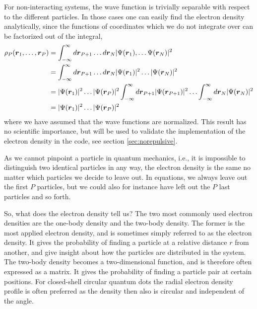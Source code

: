 For non-interacting systems, the wave function is trivially separable with respect to the different particles. In those cases one can easily find the electron density analytically, since the functions of coordinates which we do not integrate over can be factorized out of the integral,
\begin{equation}
\begin{aligned}
\rho_P(\boldsymbol{{r}}_1,\hdots,\boldsymbol{{r}}_P)&=\int_{-\infty}^{\infty}d\boldsymbol{{r}}_{P+1}\hdots d\boldsymbol{{r}}_N |\Psi(\boldsymbol{{r}}_1),\hdots \Psi(\boldsymbol{{r}}_N)|^2\\
&=\int_{-\infty}^{\infty}d\boldsymbol{{r}}_{P+1}\hdots d\boldsymbol{{r}}_N |\Psi(\boldsymbol{{r}}_1)|^2\hdots |\Psi(\boldsymbol{{r}}_N)|^2\\
&=|\Psi(\boldsymbol{{r}}_1)|^2\hdots |\Psi(\boldsymbol{{r}}_P)|^2\int_{-\infty}^{\infty}d\boldsymbol{{r}}_{P+1}|\Psi(\boldsymbol{{r}}_{P+1})|^2\hdots\int_{-\infty}^{\infty}d\boldsymbol{{r}}_{N}|\Psi(\boldsymbol{{r}}_{N})|^2\\
&=|\Psi(\boldsymbol{{r}}_1)|^2\hdots |\Psi(\boldsymbol{{r}}_P)|^2
\end{aligned}
\end{equation}
where we have assumed that the wave functions are normalized. This result has no scientific importance, but will be used to validate the implementation of the electron density in the code, see section \ref{sec:norepulsive}.

As we cannot pinpoint a particle in quantum mechanics, i.e., it is impossible to distinguish two identical particles in any way, the electron density is the same no matter which particles we decide to leave out. In equations, we always leave out the first $P$ particles, but we could also for instance have left out the $P$ last particles and so forth.

So, what does the electron density tell us? The two most commonly used electron densities are the one-body density and the two-body density. The former is the most applied electron density, and is sometimes simply referred to as the electron density. It gives the probability of finding a particle at a relative distance $r$ from another, and give insight about how the particles are distributed in the system. The two-body density becomes a two-dimensional function, and is therefore often expressed as a matrix. It gives the probability of finding a particle pair at certain positions. For closed-shell circular quantum dots the radial electron density profile is often preferred as the density then also is circular and independent of the angle. 

